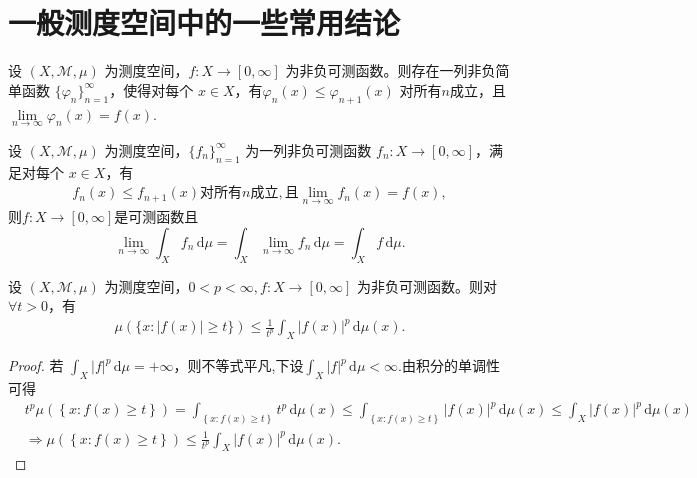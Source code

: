 \documentclass[../../main.tex]{subfiles}%
\begin{document}
\section{一般测度空间中的一些常用结论}

\begin{theorem}[简单函数逼近定理]\label{theorem:实分析-简单函数逼近定理}
设 $(X,\mathscr{M},\mu)$ 为测度空间，$f:X\to[0,\infty]$ 为非负可测函数。则存在一列非负简单函数 $\{\varphi_n\}_{n=1}^{\infty}$，使得对每个 $x\in X$，有$\varphi_n(x)\leqslant \varphi_{n+1}(x)$ 对所有$n$成立，且 $\lim\limits_{n\to\infty}\varphi_n(x)=f(x)$.
\end{theorem}

\begin{theorem}\label{theorem:实分析-Beppo Levi单调收敛定理}
设 $(X,\mathscr{M},\mu)$ 为测度空间，$\{f_n\}_{n=1}^{\infty}$ 为一列非负可测函数 $f_n:X\to[0,\infty]$，满足对每个 $x\in X$，有
\begin{align*}
f_n\left( x \right) \leqslant f_{n+1}\left( x \right) \text{对所有}n\text{成立},\text{且}\lim_{n\rightarrow \infty} f_n\left( x \right) =f\left( x \right) ,
\end{align*}
则$f:X\to[0,\infty]$是可测函数且
\[
\lim_{n\to\infty}\int_X f_n\,\mathrm{d}\mu = \int_X \lim_{n\to\infty} f_n\,\mathrm{d}\mu = \int_X f\,\mathrm{d}\mu.
\]
\end{theorem}

\begin{theorem}[Chebyshev不等式]\label{theorem:实分析-Chebyshev不等式}
设 $(X,\mathscr{M},\mu)$ 为测度空间，$0<p<\infty,f:X\to[0,\infty]$ 为非负可测函数。则对$\forall t>0$，有
\begin{align*}
\mu(\{x: |f(x)|\geqslant t\})\leqslant \frac{1}{t^p}\int_X |f(x)|^p\,\mathrm{d}\mu(x).
\end{align*}
\end{theorem}
\begin{proof}
若 $\int_X |f|^p\,\mathrm{d}\mu=+\infty$，则不等式平凡,下设$\int_X |f|^p\,\mathrm{d}\mu<\infty$.由积分的单调性可得
\begin{align*}
&t^p\mu \left( \left\{ x:f(x)\geqslant t \right\} \right) =\int_{\left\{ x:f(x)\geqslant t \right\}}{t^p\,\mathrm{d}\mu (x)}\leqslant \int_{\left\{ x:f(x)\geqslant t \right\}}{\left| f(x) \right|^p\,\mathrm{d}\mu (x)}\leqslant \int_X{\left| f(x) \right|^p\,\mathrm{d}\mu (x)}\\
&\Longrightarrow \mu \left( \left\{ x:f(x)\geqslant t \right\} \right) \leqslant \frac{1}{t^p}\int_X{\left| f(x) \right|^p\,\mathrm{d}\mu (x)}.
\end{align*}
\end{proof}
\end{document}
